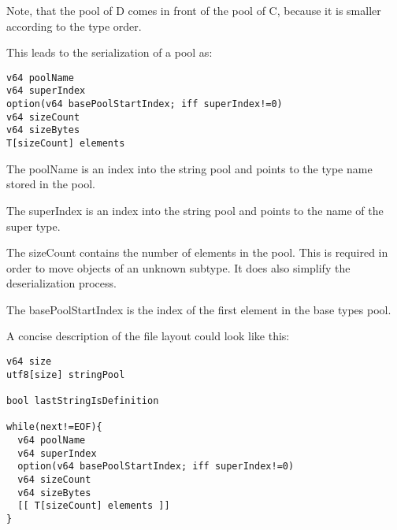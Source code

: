 \documentclass[a4paper,10pt]{article}
\begin{document}

Note, that the pool of D comes in front of the pool of C, because it is smaller according to the type order.

This leads to the serialization of a pool as:
\begin{verbatim}
v64 poolName
v64 superIndex
option(v64 basePoolStartIndex; iff superIndex!=0)
v64 sizeCount
v64 sizeBytes
T[sizeCount] elements
\end{verbatim}

The poolName is an index into the string pool and points to the type name stored in the pool.

The superIndex is an index into the string pool and points to the name of the super type.

The sizeCount contains the number of elements in the pool. This is required in order to move objects of an unknown subtype. It does also simplify the deserialization process.

The basePoolStartIndex is the index of the first element in the base types pool.



A concise description of the file layout could look like this:
\begin{verbatim}
v64 size
utf8[size] stringPool

bool lastStringIsDefinition

while(next!=EOF){
  v64 poolName
  v64 superIndex
  option(v64 basePoolStartIndex; iff superIndex!=0)
  v64 sizeCount
  v64 sizeBytes
  [[ T[sizeCount] elements ]]
}
\end{verbatim}
\end{document}
